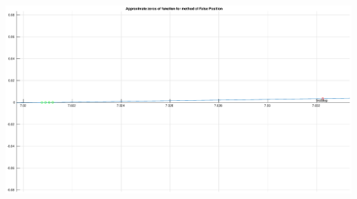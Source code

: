 \documentclass[12pt]{report}
\begin{document}
\begin{center}
   \includegraphics[scale=0.25]{task1falsepositionzommedright.eps}
\end{center}
\end{document}
